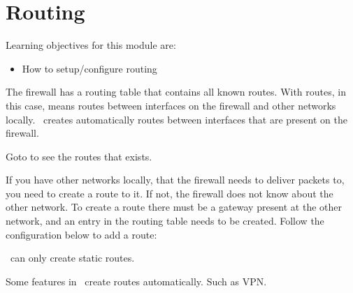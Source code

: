 \newpage

\section{Routing}

Learning objectives for this module are:
\begin{itemize}
    \item How to setup/configure routing
\end{itemize}

The firewall has a routing table that contains all known routes. With routes, in this case, means routes between interfaces on the firewall and other networks locally. \opnsense\ creates automatically routes between interfaces that are present on the firewall.

Goto  to see the routes that exists.

If you have other networks locally, that the firewall needs to deliver packets to, you need to create a route to it. If not, the firewall does not know about the other network. To create a route there must be a gateway present at the other network, and an entry in the routing table needs to be created. Follow the configuration below to add a route:


\opnsense\ can only create static routes.

\begin{importantblock}
    Some features in \opnsense\ create routes automatically. Such as VPN.
\end{importantblock}

